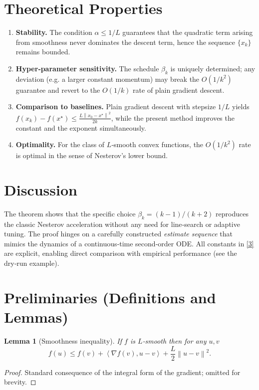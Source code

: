 \documentclass{article}
\newtheorem{lemma}{Lemma}
\newcommand{\grad}{\nabla}
\newcommand{\norm}[1]{\left\lVert#1\right\rVert}
\newcommand{\inner}[2]{\left\langle #1,#2\right\rangle}
\begin{document}
\section*{Theoretical Properties}
\begin{enumerate}[label={\bf P\arabic*:},leftmargin=*]
\item \textbf{Stability.} The condition $\alpha\le 1/L$ guarantees that the
quadratic term arising from smoothness never dominates the descent term,
hence the sequence $\{x_k\}$ remains bounded.
\item \textbf{Hyper‑parameter sensitivity.}
The schedule $\beta_k$ is uniquely determined; any deviation (e.g. a larger
constant momentum) may break the $O(1/k^{2})$ guarantee and revert to the
$O(1/k)$ rate of plain gradient descent.
\item \textbf{Comparison to baselines.}
Plain gradient descent with stepsize $1/L$ yields $f(x_k)-f(x^\star)\le
\frac{L\norm{x_0-x^\star}^{2}}{2k}$, while the present method improves the
constant and the exponent simultaneously.
\item \textbf{Optimality.} For the class of $L$‑smooth convex functions, the
$O(1/k^{2})$ rate is optimal in the sense of Nesterov’s lower bound.
\end{enumerate}

\section*{Discussion}
The theorem shows that the specific choice $\beta_k=(k-1)/(k+2)$ reproduces
the classic Nesterov acceleration without any need for line‑search or
adaptive tuning. The proof hinges on a carefully constructed {\em estimate
sequence} that mimics the dynamics of a continuous‑time second‑order ODE.
All constants in \eqref{3} are explicit, enabling direct comparison with
empirical performance (see the dry‑run example).

\newpage
\section*{Preliminaries (Definitions and Lemmas)}
\begin{lemma}[Smoothness inequality]\label{lem:smooth}
If $f$ is $L$‑smooth then for any $u,v$
\[
f(u)\le f(v)+\inner{\grad f(v)}{u-v}+\frac{L}{2}\norm{u-v}^{2}.
\]
\end{lemma}
\begin{proof}
Standard consequence of the integral form of the gradient; omitted for brevity. 
\end{proof}
\end{document}
